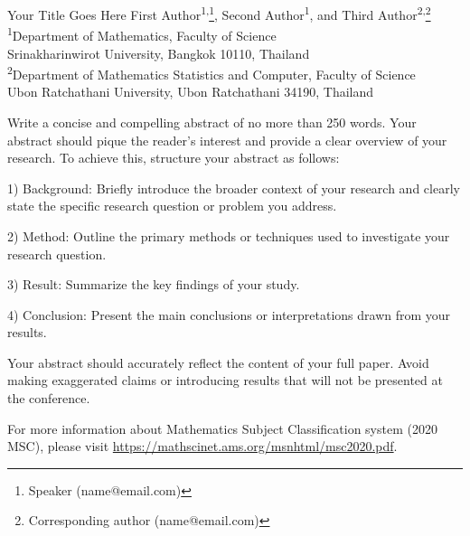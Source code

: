 \documentclass[12pt, a4paper, twoside]{article}
\newenvironment{AMM-abstract}[4][]{
  \begin{center}
    { \renewcommand\textsuperscript[1]{}\par}
    {{\Large\bfseries #2}\par}
    \medskip
    {\large #3\par}
    \bigskip
    {\small #4\par}
    \bigskip\bigskip
    {{\large\bfseries Abstract}\par}
  \end{center}
}{ 
  \bigskip
  \hrule
  \bigskip
}
\theoremstyle{plain}
\theoremstyle{definition}
\theoremstyle{remark}
\numberwithin{equation}{section}
\begin{document}
\setcounter{section}{0}


%
%

\begin{AMM-abstract}[]
{Your Title Goes Here} %
{First Author\textsuperscript{1,}\footnote{Speaker (name@email.com)}, Second Author\textsuperscript{1}, and Third Author\textsuperscript{2,}\footnote{Corresponding author (name@email.com)}} %
{\textsuperscript{1}Department of Mathematics, Faculty of Science\\Srinakharinwirot University,
Bangkok 10110, Thailand\\ \smallskip
\textsuperscript{2}Department of Mathematics Statistics and Computer, Faculty of Science\\
Ubon Ratchathani University, Ubon Ratchathani 34190, Thailand} %

Write a concise and compelling abstract of no more than 250 words. Your abstract should pique the reader's interest and provide a clear overview of your research.
To achieve this, structure your abstract as follows:

1) Background: Briefly introduce the broader context of your research and clearly state the specific research question or problem you address.
 
2) Method: Outline the primary methods or techniques used to investigate your research question.
 
3) Result: Summarize the key findings of your study.
 
4) Conclusion: Present the main conclusions or interpretations drawn from your results.
 
Your abstract should accurately reflect the content of your full paper. Avoid making exaggerated claims or introducing results that will not be presented at the conference.

For more information about Mathematics Subject Classification system (2020 MSC), please visit \url{https://mathscinet.ams.org/msnhtml/msc2020.pdf}.
\end{AMM-abstract}
\end{document}
